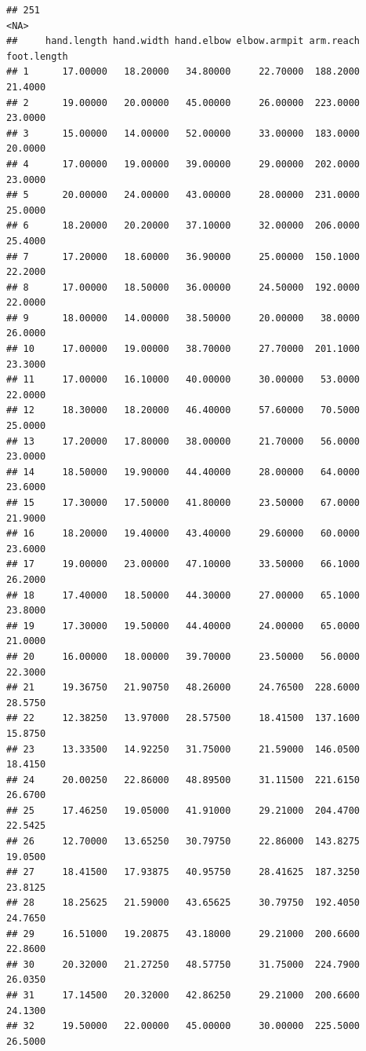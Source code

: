 \documentclass[]{article}
\begin{document}
\begin{verbatim}
## 251                                                                                                                                                <NA>
##     hand.length hand.width hand.elbow elbow.armpit arm.reach foot.length
## 1      17.00000   18.20000   34.80000     22.70000  188.2000     21.4000
## 2      19.00000   20.00000   45.00000     26.00000  223.0000     23.0000
## 3      15.00000   14.00000   52.00000     33.00000  183.0000     20.0000
## 4      17.00000   19.00000   39.00000     29.00000  202.0000     23.0000
## 5      20.00000   24.00000   43.00000     28.00000  231.0000     25.0000
## 6      18.20000   20.20000   37.10000     32.00000  206.0000     25.4000
## 7      17.20000   18.60000   36.90000     25.00000  150.1000     22.2000
## 8      17.00000   18.50000   36.00000     24.50000  192.0000     22.0000
## 9      18.00000   14.00000   38.50000     20.00000   38.0000     26.0000
## 10     17.00000   19.00000   38.70000     27.70000  201.1000     23.3000
## 11     17.00000   16.10000   40.00000     30.00000   53.0000     22.0000
## 12     18.30000   18.20000   46.40000     57.60000   70.5000     25.0000
## 13     17.20000   17.80000   38.00000     21.70000   56.0000     23.0000
## 14     18.50000   19.90000   44.40000     28.00000   64.0000     23.6000
## 15     17.30000   17.50000   41.80000     23.50000   67.0000     21.9000
## 16     18.20000   19.40000   43.40000     29.60000   60.0000     23.6000
## 17     19.00000   23.00000   47.10000     33.50000   66.1000     26.2000
## 18     17.40000   18.50000   44.30000     27.00000   65.1000     23.8000
## 19     17.30000   19.50000   44.40000     24.00000   65.0000     21.0000
## 20     16.00000   18.00000   39.70000     23.50000   56.0000     22.3000
## 21     19.36750   21.90750   48.26000     24.76500  228.6000     28.5750
## 22     12.38250   13.97000   28.57500     18.41500  137.1600     15.8750
## 23     13.33500   14.92250   31.75000     21.59000  146.0500     18.4150
## 24     20.00250   22.86000   48.89500     31.11500  221.6150     26.6700
## 25     17.46250   19.05000   41.91000     29.21000  204.4700     22.5425
## 26     12.70000   13.65250   30.79750     22.86000  143.8275     19.0500
## 27     18.41500   17.93875   40.95750     28.41625  187.3250     23.8125
## 28     18.25625   21.59000   43.65625     30.79750  192.4050     24.7650
## 29     16.51000   19.20875   43.18000     29.21000  200.6600     22.8600
## 30     20.32000   21.27250   48.57750     31.75000  224.7900     26.0350
## 31     17.14500   20.32000   42.86250     29.21000  200.6600     24.1300
## 32     19.50000   22.00000   45.00000     30.00000  225.5000     26.5000

\end{verbatim}
\end{document}
